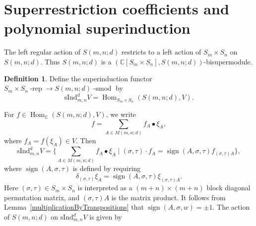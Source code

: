 \documentclass[12pt,reqno]{amsart}
\theoremstyle{definition}
\newtheorem{definition}[theorem]{Definition}
\theoremstyle{remark}
\newcommand{\ind}{\mathrm{sInd}_{m,n}^{d}}
\DeclareMathOperator{\Hom}{Hom}
\DeclareMathOperator{\smod}{-smod}
\DeclareMathOperator{\rep}{-rep}
\DeclareMathOperator{\sign}{sign}
\begin{document}
\section{Superrestriction coefficients and polynomial superinduction}\label{superInduction}

The left regular action of $S(m,n;d)$ restricts to a left action of $S_{m}\times S_{n}$ on $S(m,n;d)$. Thus $S(m,n;d)$ is a $(\mathbb{C}[S_{m}\times S_{n}],S(m,n;d))$-bisupermodule.
\begin{definition}
    Define the superinduction functor $S_m\times S_n\rep\to S(m,n;d)\smod$ by
    \begin{displaymath}
        \ind V = \Hom_{S_m\times S_n}(S(m,n;d), V).
    \end{displaymath}
\end{definition}
For $f\in \Hom_{\mathbb C}(S(m,n;d), V)$, we write
\begin{displaymath}
    f = \sum_{A\in M(m,n;d)} f_A\bullet\xi_A,
\end{displaymath}
where $f_A = f(\xi_A)\in V$.
Then
\begin{displaymath}
    \ind V = \Big\{\sum_{A\in M(m,n;d)} f_A\bullet\xi_A \mid (\sigma,\tau)\cdot f_{A}=\sign(A,\sigma,\tau)f_{(\sigma,\tau)A}\Big\},
\end{displaymath}
where $\sign(A,\sigma,\tau)$ is defined by requiring $$\delta_{(\sigma,\tau)}\xi_{A}=\sign(A,\sigma,\tau)\xi_{(\sigma,\tau)A}.$$ Here $(\sigma,\tau)\in S_{m}\times S_{n}$ is interpreted as a $(m+n)\times(m+n)$ block diagonal permutation matrix, and $(\sigma,\tau)A$ is the matrix product.
It follows from Lemma~\ref{multiplicationByTranspositions} that $\sign(A,\sigma,w)=\pm 1$. The action of $S(m,n;d)$ on $\ind V$ \cite[Equation 3.4]{rosso2015towers} is given by
\end{document}
